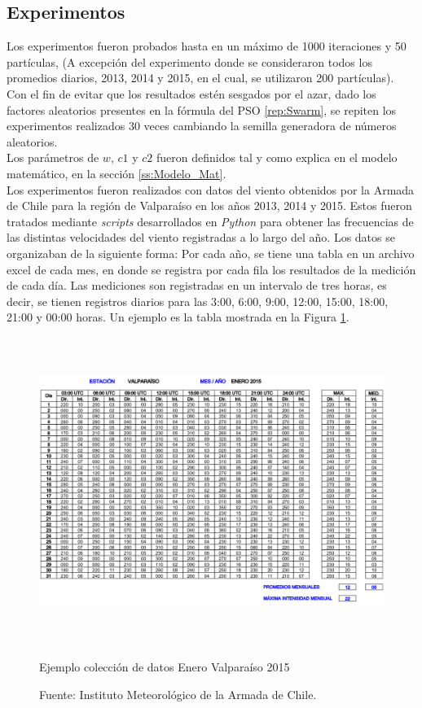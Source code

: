 \subsection{Experimentos}
Los experimentos fueron probados hasta en un máximo de 1000 iteraciones y 50 partículas, (A excepción del experimento donde se consideraron todos los promedios diarios, 2013, 2014 y 2015, en el cual, se utilizaron 200 partículas). \\
Con el fin de evitar que los resultados estén sesgados por el azar, dado los factores aleatorios presentes en la fórmula del PSO 
\ref{rep:Swarm}, se repiten los experimentos realizados 30 veces cambiando la semilla generadora de números aleatorios. \\
Los parámetros de $w$, $c1$ y $c2$ fueron definidos tal y como explica en el modelo matemático, en la sección \ref{ss:Modelo_Mat}.\\
Los experimentos fueron realizados con datos del viento obtenidos por la Armada de Chile para la región de Valparaíso en los años 2013, 2014 y 2015. Estos fueron tratados mediante \emph{scripts} desarrollados en \emph{Python} para obtener las frecuencias de las distintas velocidades del viento registradas a lo largo del año. Los datos se organizaban de la siguiente forma: Por cada año, se tiene una tabla en un archivo excel de cada mes, en donde se registra por cada fila los resultados de la medición de cada día. Las mediciones son registradas en un intervalo de tres horas, es decir, se tienen registros diarios para las 3:00, 6:00, 9:00, 12:00, 15:00, 18:00, 21:00 y 00:00 horas. Un ejemplo es la tabla mostrada en la Figura \ref{fig:example_data}.\\
 \begin{figure}[h!]
    \centering
    \includegraphics[height=100mm]{figures/example_data.png}
    \caption{Ejemplo colección de datos Enero Valparaíso 2015}
    \vspace{-.25cm}
    \caption*{Fuente: Instituto Meteorológico de la Armada de Chile.}
    \label{fig:example_data}
 \end{figure}

